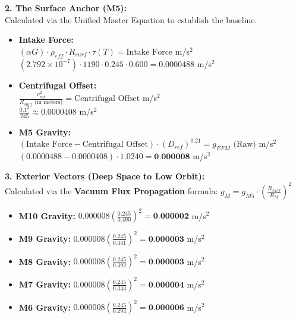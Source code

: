 \documentclass[11pt, a4paper]{article}
\begin{document}
  \vspace{1.0em}
  \noindent \textbf{2. The Surface Anchor (M5):} \\
  \hspace*{1em} Calculated via the Unified Master Equation to establish the baseline.
  \begin{itemize}
    \item \textbf{Intake Force:} \\[0.5em]
    \hspace*{2em} $(\alpha G) \cdot \rho_{eff} \cdot R_{surf} \cdot \tau(T) = \text{Intake Force}$ m/s$^2$ \\[1em]
    \hspace*{2em} $(2.792 \times 10^{-7}) \cdot 1190 \cdot 0.245 \cdot 0.600 = 0.0000488$ m/s$^2$
    
    \item \textbf{Centrifugal Offset:} \\[0.5em]
    \hspace*{2em} $\frac{v_{rot}^2}{R_{surf} \text{ (in meters)}} = \text{Centrifugal Offset}$ m/s$^2$ \\[1em]
    \hspace*{2em} $\frac{0.1^2}{245} \approx 0.0000408$ m/s$^2$
    
    \item \textbf{M5 Gravity:} \\[0.5em]
    \hspace*{2em} $(\text{Intake Force} - \text{Centrifugal Offset}) \cdot (D_{ref})^{0.21} = g_{EFM} \text{ (Raw)}$ m/s$^2$ \\[1em]
    \hspace*{2em} $(0.0000488 - 0.0000408) \cdot 1.0240 = \textbf{0.000008}$ m/s$^2$
  \end{itemize}

  \clearpage
  \noindent \textbf{3. Exterior Vectors (Deep Space to Low Orbit):} \\
  \hspace*{1em} Calculated via the \textbf{Vacuum Flux Propagation} formula: $g_M = g_{M5} \cdot \left( \frac{R_{surf}}{R_M} \right)^2$
  \begin{itemize}
    \item \textbf{M10 Gravity:} $0.000008 \left( \frac{0.245}{0.490} \right)^2 = \textbf{0.000002}$ m/s$^2$
    \item \textbf{M9 Gravity:} $0.000008 \left( \frac{0.245}{0.441} \right)^2 = \textbf{0.000003}$ m/s$^2$
    \item \textbf{M8 Gravity:} $0.000008 \left( \frac{0.245}{0.392} \right)^2 = \textbf{0.000003}$ m/s$^2$
    \item \textbf{M7 Gravity:} $0.000008 \left( \frac{0.245}{0.343} \right)^2 = \textbf{0.000004}$ m/s$^2$
    \item \textbf{M6 Gravity:} $0.000008 \left( \frac{0.245}{0.294} \right)^2 = \textbf{0.000006}$ m/s$^2$
  \end{itemize}
\end{document}
